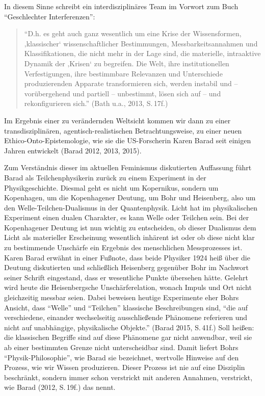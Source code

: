 In diesem Sinne schreibt ein interdisziplinäres Team im Vorwort zum Buch
\enquote{Geschlechter Interferenzen}:

\begin{quote}
\enquote{D.h. es geht auch ganz wesentlich um eine Krise der
Wissensformen, ‚klassischer` wissenschaftlicher Bestimmungen,
Messbarkeitsannahmen und Klassifikationen, die nicht mehr in der Lage
sind, die materielle, intraaktive Dynamik der ‚Krisen` zu begreifen. Die
Welt, ihre institutionellen Verfestigungen, ihre bestimmbare Relevanzen
und Unterschiede produzierenden Apparate transformieren sich, werden
instabil und -- vorübergehend und partiell -- unbestimmt, lösen sich auf
-- und rekonfigurieren sich.} (Bath u.a., 2013, S.\,17f.)
\end{quote}

Im Ergebnis einer zu verändernden Weltsicht kommen wir dann zu einer
transdisziplinären, agentisch-realistischen Betrachtungsweise, zu einer
neuen Ethico-Onto-Epistemologie, wie sie die US-Forscherin Karen Barad
seit einigen Jahren entwickelt (Barad 2012, 2013, 2015).

Zum Verständnis dieser im aktuellen Feminismus diskutierten Auffassung
führt Barad als Teilchenphysikerin zurück zu einem Experiment in der
Physikgeschichte. Diesmal geht es nicht um Kopernikus, sondern um
Kopenhagen, um die Kopenhagener Deutung, um Bohr und Heisenberg, also um
den Welle-Teilchen-Dualismus in der Quantenphysik. Licht hat im
physikalischen Experiment einen dualen Charakter, es kann Welle oder
Teilchen sein. Bei der Kopenhagener Deutung ist nun wichtig zu
entscheiden, ob dieser Dualismus dem Licht als materieller Erscheinung
wesentlich inhärent ist oder ob diese nicht klar zu bestimmende
Unschärfe ein Ergebnis des menschlichen Messprozesses ist. Karen Barad
erwähnt in einer Fußnote, dass beide Physiker 1924 heiß über die Deutung
diskutierten und schließlich Heisenberg gegenüber Bohr im Nachwort
seiner Schrift eingestand, dass er wesentliche Punkte übersehen hätte.
Gelehrt wird heute die Heisenbergsche Unschärferelation, wonach Impuls
und Ort nicht gleichzeitig messbar seien. Dabei beweisen heutige
Experimente eher Bohrs Ansicht, dass \enquote{Welle} und
\enquote{Teilchen} klassische Beschreibungen sind, \enquote{die auf
verschiedene, einander wechselseitig ausschließende Phänomene referieren
und nicht auf unabhängige, physikalische Objekte.} (Barad 2015, S.\,41f.)
Soll heißen: die klassischen Begriffe sind auf diese Phänomene gar nicht
anwendbar, weil sie ab einer bestimmten Grenze nicht unterscheidbar
sind. Damit liefert Bohrs \enquote{Physik-Philosophie}, wie Barad sie
bezeichnet, wertvolle Hinweise auf den Prozess, wie wir Wissen
produzieren. Dieser Prozess ist nie auf eine Disziplin beschränkt,
sondern immer schon verstrickt mit anderen Annahmen, verstrickt, wie
Barad (2012, S.\,19f.) das nennt.

